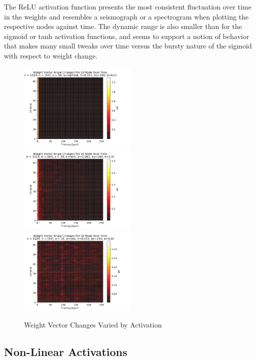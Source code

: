 \documentclass[10pt,epsf]{article}
\begin{document}
{{{      The ReLU activation function presents the most consistent fluctuation over time in the weights
      and resembles a seismograph or a spectrogram when plotting the respective nodes against time.
      The dynamic range is also smaller than for the sigmoid or tanh activation functions, and seems
      to support a notion of behavior that makes many small tweaks over time versus the bursty nature
      of the sigmoid with respect to weight change.
    }
    \begin{figure}[H]
      \includegraphics[width=0.5\textwidth]{./img/64-0.001-160-0-sigmoid-1/weight-angle-changes-L0-255.png}
      \includegraphics[width=0.5\textwidth]{./img/64-0.001-160-0-tanh-1/weight-angle-changes-L0-255.png}
      \includegraphics[width=0.5\textwidth]{./img/64-0.001-160-0-relu-1/weight-angle-changes-L0-255.png}
      \caption{Weight Vector Changes Varied by Activation}
      \label{fig:dw-by-u}
    \end{figure}
  }

  \subsection{Non-Linear Activations}{
}}
\end{document}
